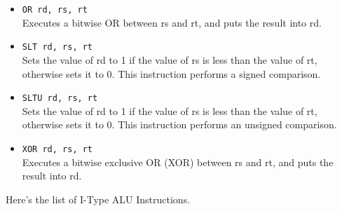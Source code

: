 \documentclass[12pt]{report}
\begin{document}
\begin{itemize}
	\item \texttt{OR rd, rs, rt}\\
	Executes a bitwise OR between rs and rt, and puts the result into rd.

	\item \texttt{SLT rd, rs, rt}\\
	Sets the value of rd to 1 if the value of rs is less than the value of rt,
	otherwise sets it to 0. This instruction performs a signed comparison.

	\item \texttt{SLTU rd, rs, rt}\\
	Sets the value of rd to 1 if the value of rs is less than the value of rt,
	otherwise sets it to 0. This instruction performs an unsigned comparison.

	\item \texttt{XOR rd, rs, rt}\\
	Executes a bitwise exclusive OR (XOR) between rs and rt, and puts the result into rd.
\end{itemize}

Here's the list of I-Type ALU Instructions.
\end{document}

